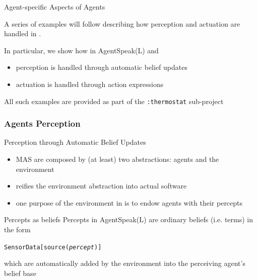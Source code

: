 \documentclass[presentation]{beamer}\mode<presentation>{\usetheme{AMSBolognaFC}}
\begin{document}
\begin{frame}[c]{Agent-specific Aspects of \jason{} Agents}
    
    A series of examples will follow describing how \alert{perception} and \alert{actuation} are handled in \jason{}.
    
    \vfill
    
    In particular, we show how in AgentSpeak(L) and \jason{}
    \begin{itemize}
        \item perception is handled through \alert{automatic belief updates}
        \item actuation is handled through \alert{action expressions}
    \end{itemize}
    
    \vfill
    
    All such examples are provided as part of the \texttt{:thermostat} sub-project
    
\end{frame} 

\subsubsection{Agents Perception}

\begin{frame}[c]{Perception through Automatic Belief Updates}
    
    \begin{itemize}
        \item MAS are composed by (at least) two abstractions: agents and the \alert{environment}
        
        \vfill
        
        \item \jason{} reifies the environment abstraction into actual software
        
        \vfill
        
        \item one purpose of the environment in \jason{} is to endow agents with their \alert{percepts}
        
    \end{itemize}
    
    \vfill
    
    \begin{block}{Percepts as beliefs}
        Percepts in AgentSpeak(L) are ordinary beliefs (i.e. terms) in the form
        \begin{center}
            \texttt{SensorData\alert{[source(\textit{percept})]}}
        \end{center}
        which are \alert{automatically} added by the environment into the perceiving agent's belief base
    \end{block}
    
\end{frame} 
\end{document}
